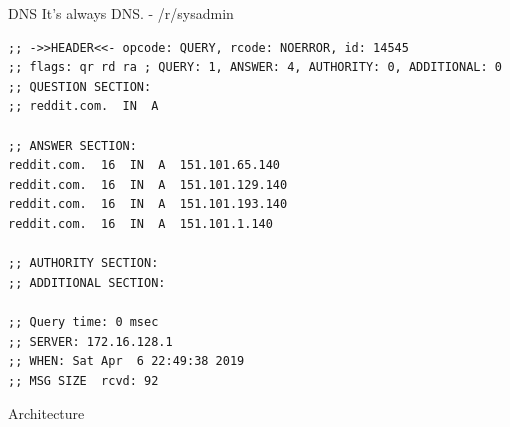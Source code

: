 \documentclass{beamer}
\begin{document}
\begin{frame}[fragile]{DNS}
  It's always DNS. - /r/sysadmin
  \scriptsize
  \begin{lstlisting}
;; ->>HEADER<<- opcode: QUERY, rcode: NOERROR, id: 14545
;; flags: qr rd ra ; QUERY: 1, ANSWER: 4, AUTHORITY: 0, ADDITIONAL: 0
;; QUESTION SECTION:
;; reddit.com.  IN  A

;; ANSWER SECTION:
reddit.com.  16  IN  A  151.101.65.140
reddit.com.  16  IN  A  151.101.129.140
reddit.com.  16  IN  A  151.101.193.140
reddit.com.  16  IN  A  151.101.1.140

;; AUTHORITY SECTION:
;; ADDITIONAL SECTION:

;; Query time: 0 msec
;; SERVER: 172.16.128.1
;; WHEN: Sat Apr  6 22:49:38 2019
;; MSG SIZE  rcvd: 92
  \end{lstlisting}
\end{frame}

\begin{frame}{Architecture}
\end{frame}
\end{document}

